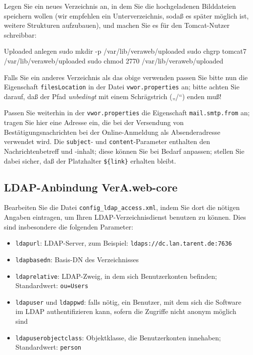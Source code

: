 \begin{minipage}{\textwidth}
Legen Sie ein neues Verzeichnis an, in dem Sie die hochgeladenen
Bilddateien speichern wollen (wir empfehlen ein Unterverzeichnis,
sodaß es später möglich ist, weitere Strukturen aufzubauen), und
machen Sie es für den Tomcat-Nutzer schreibbar:

\begin{lstdump}{Uploaded anlegen}
sudo mkdir -p /var/lib/veraweb/uploaded
sudo chgrp tomcat7 /var/lib/veraweb/uploaded
sudo chmod 2770 /var/lib/veraweb/uploaded
\end{lstdump}

Falls Sie ein anderes Verzeichnis als das obige verwenden passen
Sie bitte nun die Eigenschaft \texttt{filesLocation} in der Datei
\texttt{vwor.properties} an; bitte achten Sie darauf, daß der
Pfad \emph{unbedingt} mit einem Schrägstrich („/“) enden muß!
\end{minipage}

\ifoa

Passen Sie weiterhin in der \texttt{vwor.properties} die Eigenschaft
\texttt{mail.smtp.from} an; tragen Sie hier eine Adresse ein, die bei
der Versendung von Bestätigungsnachrichten bei der Online-Anmeldung
als Absenderadresse verwendet wird. Die \texttt{subject}- und
\texttt{content}-Parameter enthalten den Nachrichtenbetreff und
-inhalt; diese können Sie bei Bedarf anpassen; stellen Sie dabei
sicher, daß der Platzhalter \texttt{\$\{link\}} erhalten bleibt.

\fi%

\subsection{LDAP-Anbindung VerA.web-core}\label{subsec:setup-core-ldap}

Bearbeiten Sie die Datei \texttt{config\_ldap\_access.xml}, indem Sie
dort die nötigen Angaben eintragen, um Ihren LDAP-Verzeichnisdienst
benutzen zu können. Dies sind insbesondere die folgenden Parameter:\keinumbruch

\begin{itemize}
 \item{\texttt{ldapurl}: LDAP-Server, zum Beispiel:
  \texttt{ldaps://dc.lan.tarent.de:7636}}
 \item{\texttt{ldapbasedn}: Basis-DN des Verzeichnisses}
 \item{\texttt{ldaprelative}: LDAP-Zweig, in dem sich Benutzerkonten
  befinden; Standardwert: \texttt{ou=Users}}
 \item{\texttt{ldapuser} und \texttt{ldappwd}: falls nötig, ein
  Benutzer, mit dem sich die Software im LDAP authentifizieren kann,
  sofern die Zugriffe nicht anonym möglich sind}
 \item{\texttt{ldapuserobjectclass}: Objektklasse, die Benutzerkonten
  innehaben; Standardwert: \texttt{person}}
\end{itemize}

